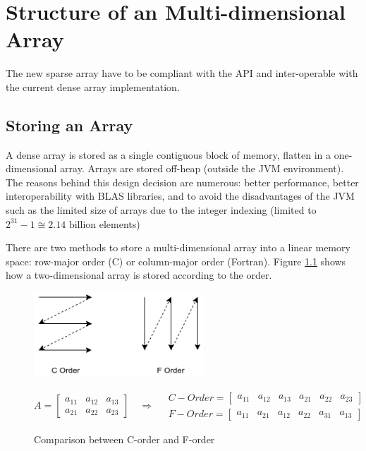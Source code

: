\chapter{Structure of an Multi-dimensional Array}
The new sparse array have to be compliant with the API and inter-operable with the current dense array implementation.



\section{Storing an Array}
\label{sec:storing}

A dense array is stored as a single contiguous block of memory, flatten in a one-dimensional array. Arrays are stored off-heap (outside the JVM environment). The reasons behind this design decision are numerous: better performance, better interoperability with BLAS libraries, and to avoid the disadvantages of the {JVM} such as the limited size of arrays due to the integer indexing (limited to $2^{31}-1 \cong 2.14 \text{ billion}$ elements)

There are two methods to store a multi-dimensional array into a linear memory space: row-major order (C) or column-major order (Fortran). Figure \ref{fig:orders} shows how a two-dimensional array is stored according to the order.

\begin{figure}[h]
	\begin{center}
		\includegraphics[width=2.5in]{images/c_f_OrdersLabelled.png} 
		\label{fig:cOrders}
	\end{center}
	\[
	A = 
	\begin{bmatrix}
	a_{11} &  a_{12} & a_{13} \\
	a_{21} &  a_{22} & a_{23}
	\end{bmatrix}
	\quad\Rightarrow\quad
	\begin{aligned}
	C-Order = 
	\begin{bmatrix}
	a_{11} &  a_{12} & a_{13} & a_{21} &  a_{22} & a_{23}
	\end{bmatrix}
	\\
	F-Order = 
	\begin{bmatrix}
	a_{11} &  a_{21} & a_{12} & a_{22} &  a_{31} & a_{13}
	\end{bmatrix}
	\end{aligned}
	\]
\caption{Comparison between C-order and F-order}
\label{fig:orders}

\end{figure}

